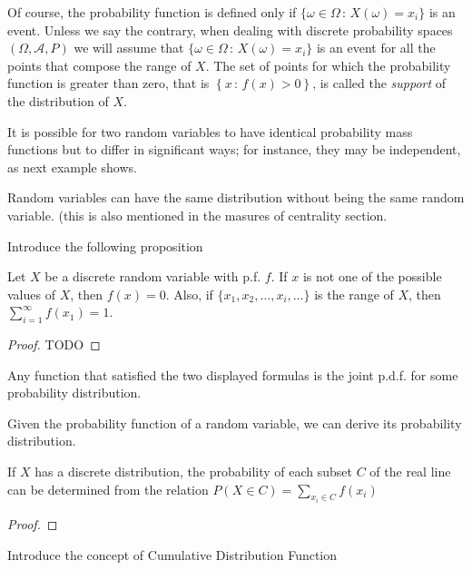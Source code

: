 Of course, the probability function is defined only if $\{ \omega \in \Omega \,:\, X \left( \omega \right) = x_i\}$ is an event. Unless we say the contrary, when dealing with discrete probability spaces $\left( \Omega, \mathcal{A}, P \right)$ we will assume that $\{ \omega \in \Omega \,:\, X \left( \omega \right) = x_i\}$ is an event for all the points that compose the range of $X$. The set of points for which the probability function is greater than zero, that is $\left\{ x \, : \, f \left( x \right) > 0 \right\}$, is called the \emph{support} of the distribution of $X$.

It is possible for two random variables to have identical probability mass functions but to differ in significant ways; for instance, they may be independent, as next example shows.

\begin{example}
{\color{red} Random variables can have the same distribution without being the same random variable. (this is also mentioned in the masures of centrality section}.
\end{example}


{\color{red} Introduce the following proposition}

\begin{proposition}
Let $X$ be a discrete random variable with p.f. $f$. If $x$ is not one of the possible values of $X$, then $f\left(x\right)=0$. Also, if $\{ x_1, x_2, \ldots, x_i, \ldots \}$ is the range of $X$, then $\sum_{i=1}^{\infty}f\left(x_{1}\right)=1$.
\end{proposition}
\begin{proof}
{\color{red} TODO}
\end{proof}

{\color{red} Any function that satisfied the two displayed formulas is the joint p.d.f. for some probability distribution.}

Given the probability function of a random variable, we can derive its probability distribution.

\begin{proposition}
If $X$ has a discrete distribution, the probability of each subset $C$ of the real line can be determined from the relation $P\left(X\in C\right)=\sum_{x_{i}\in C}f\left(x_{i}\right)$
\end{proposition}
\begin{proof}
\end{proof}

{\color{red} Introduce the concept of Cumulative Distribution Function}

